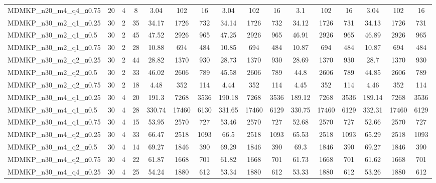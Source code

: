 \begin{sidewaystable}[!ht]
{\begin{tabular}{lccccccccccccccc}
MDMKP\_n20\_m4\_q4\_α0.75 & 20 & 4 & 8 &  \textcolor{blue2}{3.04} & 102 & 16 &  \textcolor{blue2}{3.04} & 102 & 16 & 3.1 & 102 & 16 &  \textcolor{blue2}{3.04} & 102 & 16 \\
MDMKP\_n30\_m2\_q1\_α0.25 & 30 & 2 & 35 & 34.17 & 1726 & 732 & 34.14 & 1726 & 732 &  \textcolor{blue2}{34.12} & 1726 & 731 & 34.13 & 1726 & 731 \\
MDMKP\_n30\_m2\_q1\_α0.5 & 30 & 2 & 45 & 47.52 & 2926 & 965 & 47.25 & 2926 & 965 & 46.91 & 2926 & 965 &  \textcolor{blue2}{46.89} & 2926 & 965 \\
MDMKP\_n30\_m2\_q1\_α0.75 & 30 & 2 & 28 & 10.88 & 694 & 484 &  \textcolor{blue2}{10.85} & 694 & 484 & 10.87 & 694 & 484 & 10.87 & 694 & 484 \\
MDMKP\_n30\_m2\_q2\_α0.25 & 30 & 2 & 44 & 28.82 & 1370 & 930 & 28.73 & 1370 & 930 &  \textcolor{blue2}{28.69} & 1370 & 930 & 28.7 & 1370 & 930 \\
MDMKP\_n30\_m2\_q2\_α0.5 & 30 & 2 & 33 & 46.02 & 2606 & 789 & 45.58 & 2606 & 789 &  \textcolor{blue2}{44.8} & 2606 & 789 & 44.85 & 2606 & 789 \\
MDMKP\_n30\_m2\_q2\_α0.75 & 30 & 2 & 18 & 4.48 & 352 & 114 &  \textcolor{blue2}{4.44} & 352 & 114 & 4.45 & 352 & 114 & 4.46 & 352 & 114 \\
MDMKP\_n30\_m4\_q1\_α0.25 & 30 & 4 & 20 & 191.3 & 7268 & 3536 & 190.18 & 7268 & 3536 &  \textcolor{blue2}{189.12} & 7268 & 3536 & 189.14 & 7268 & 3536 \\
MDMKP\_n30\_m4\_q1\_α0.5 & 30 & 4 & 28 &  \textcolor{blue2}{330.74} & 17460 & 6130 & 331.65 & 17460 & 6129 & 330.75 & 17460 & 6129 & 332.31 & 17460 & 6129 \\
MDMKP\_n30\_m4\_q1\_α0.75 & 30 & 4 & 15 & 53.95 & 2570 & 727 & 53.46 & 2570 & 727 & 52.68 & 2570 & 727 &  \textcolor{blue2}{52.66} & 2570 & 727 \\
MDMKP\_n30\_m4\_q2\_α0.25 & 30 & 4 & 33 & 66.47 & 2518 & 1093 & 66.5 & 2518 & 1093 & 65.53 & 2518 & 1093 &  \textcolor{blue2}{65.29} & 2518 & 1093 \\
MDMKP\_n30\_m4\_q2\_α0.5 & 30 & 4 & 14 &  \textcolor{blue2}{69.27} & 1846 & 390 & 69.29 & 1846 & 390 & 69.3 & 1846 & 390 &  \textcolor{blue2}{69.27} & 1846 & 390 \\
MDMKP\_n30\_m4\_q2\_α0.75 & 30 & 4 & 22 & 61.87 & 1668 & 701 & 61.82 & 1668 & 701 & 61.73 & 1668 & 701 &  \textcolor{blue2}{61.62} & 1668 & 701 \\
MDMKP\_n30\_m4\_q4\_α0.25 & 30 & 4 & 25 & 54.24 & 1880 & 612 & 53.34 & 1880 & 612 & 53.33 & 1880 & 612 &  \textcolor{blue2}{53.26} & 1880 & 612 \\

\end{tabular}}
\end{sidewaystable}

